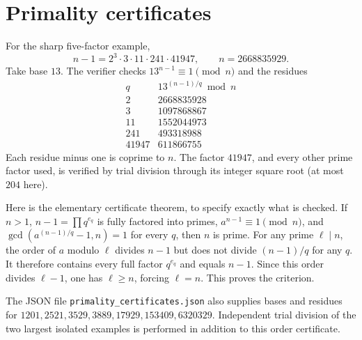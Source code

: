 \documentclass[11pt]{article}
\theoremstyle{remark}\newtheorem{remark}[theorem]{Remark}
\begin{document}
\section{Primality certificates}\label{app:prime}
For the sharp five-factor example,
\[
 n-1=2^3\cdot3\cdot11\cdot241\cdot41947,
 \qquad n=2668835929.
\]
Take base $13$. The verifier checks $13^{n-1}\equiv1\pmod n$ and the residues
\[
 \begin{array}{c|r}
 q&13^{(n-1)/q}\bmod n\\\hline
 2&2668835928\\
 3&1097868867\\
 11&1552044973\\
 241&493318988\\
 41947&611866755
 \end{array}
\]
Each residue minus one is coprime to $n$. The factor $41947$, and every other prime factor used, is verified by trial division through its integer square root (at most $204$ here).

Here is the elementary certificate theorem, to specify exactly what is checked. If $n>1$, $n-1=\prod q^{e_q}$ is fully factored into primes, $a^{n-1}\equiv1\pmod n$, and $\gcd(a^{(n-1)/q}-1,n)=1$ for every $q$, then $n$ is prime. For any prime $\ell\mid n$, the order of $a$ modulo $\ell$ divides $n-1$ but does not divide $(n-1)/q$ for any $q$. It therefore contains every full factor $q^{e_q}$ and equals $n-1$. Since this order divides $\ell-1$, one has $\ell\ge n$, forcing $\ell=n$. This proves the criterion.

The JSON file \texttt{primality\_certificates.json} also supplies bases and residues for $1201,2521,3529,3889,17929,153409,6320329$. Independent trial division of the two largest isolated examples is performed in addition to this order certificate.
\end{document}
